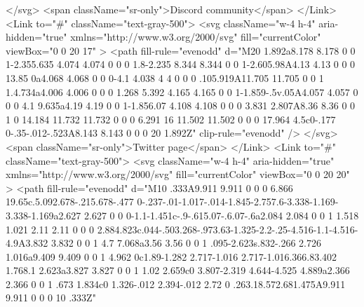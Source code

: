 {                                                </svg>
                                                <span className="sr-only">Discord community</span>
                                            </Link>
                                            <Link to="#" className="text-gray-500">
                                                <svg
                                                    className="w-4 h-4"
                                                    aria-hidden="true"
                                                    xmlns="http://www.w3.org/2000/svg"
                                                    fill="currentColor"
                                                    viewBox="0 0 20 17"
                                                >
                                                    <path
                                                        fill-rule="evenodd"
                                                        d="M20 1.892a8.178 8.178 0 0 1-2.355.635 4.074 4.074 0 0 0 1.8-2.235 8.344 8.344 0 0 1-2.605.98A4.13 4.13 0 0 0 13.85 0a4.068 4.068 0 0 0-4.1 4.038 4 4 0 0 0 .105.919A11.705 11.705 0 0 1 1.4.734a4.006 4.006 0 0 0 1.268 5.392 4.165 4.165 0 0 1-1.859-.5v.05A4.057 4.057 0 0 0 4.1 9.635a4.19 4.19 0 0 1-1.856.07 4.108 4.108 0 0 0 3.831 2.807A8.36 8.36 0 0 1 0 14.184 11.732 11.732 0 0 0 6.291 16 11.502 11.502 0 0 0 17.964 4.5c0-.177 0-.35-.012-.523A8.143 8.143 0 0 0 20 1.892Z"
                                                        clip-rule="evenodd"
                                                    />
                                                </svg>
                                                <span className="sr-only">Twitter page</span>
                                            </Link>
                                            <Link to="#" className="text-gray-500">
                                                <svg
                                                    className="w-4 h-4"
                                                    aria-hidden="true"
                                                    xmlns="http://www.w3.org/2000/svg"
                                                    fill="currentColor"
                                                    viewBox="0 0 20 20"
                                                >
                                                    <path
                                                        fill-rule="evenodd"
                                                        d="M10 .333A9.911 9.911 0 0 0 6.866 19.65c.5.092.678-.215.678-.477 0-.237-.01-1.017-.014-1.845-2.757.6-3.338-1.169-3.338-1.169a2.627 2.627 0 0 0-1.1-1.451c-.9-.615.07-.6.07-.6a2.084 2.084 0 0 1 1.518 1.021 2.11 2.11 0 0 0 2.884.823c.044-.503.268-.973.63-1.325-2.2-.25-4.516-1.1-4.516-4.9A3.832 3.832 0 0 1 4.7 7.068a3.56 3.56 0 0 1 .095-2.623s.832-.266 2.726 1.016a9.409 9.409 0 0 1 4.962 0c1.89-1.282 2.717-1.016 2.717-1.016.366.83.402 1.768.1 2.623a3.827 3.827 0 0 1 1.02 2.659c0 3.807-2.319 4.644-4.525 4.889a2.366 2.366 0 0 1 .673 1.834c0 1.326-.012 2.394-.012 2.72 0 .263.18.572.681.475A9.911 9.911 0 0 0 10 .333Z"
}
